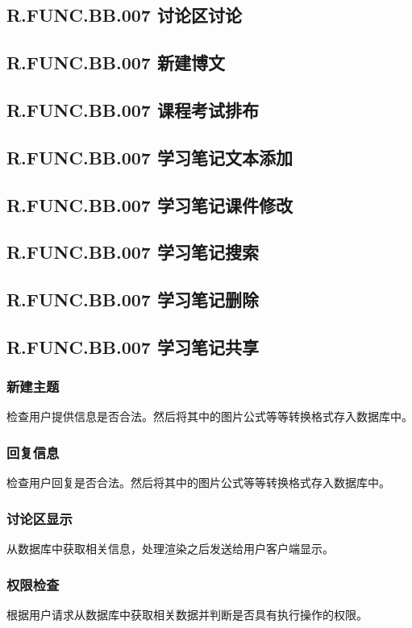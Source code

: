 \subsection{R.FUNC.BB.007   讨论区讨论}
\subsection{R.FUNC.BB.007   新建博文}
\subsection{R.FUNC.BB.007   课程考试排布}
\subsection{R.FUNC.BB.007   学习笔记文本添加}
\subsection{R.FUNC.BB.007   学习笔记课件修改}
\subsection{R.FUNC.BB.007   学习笔记搜索}
\subsection{R.FUNC.BB.007   学习笔记删除}
\subsection{R.FUNC.BB.007   学习笔记共享}


\subsubsection{新建主题}
检查用户提供信息是否合法。然后将其中的图片公式等等转换格式存入数据库中。
\subsubsection{回复信息}
检查用户回复是否合法。然后将其中的图片公式等等转换格式存入数据库中。
\subsubsection{讨论区显示}
从数据库中获取相关信息，处理渲染之后发送给用户客户端显示。
\subsubsection{权限检查}
根据用户请求从数据库中获取相关数据并判断是否具有执行操作的权限。
